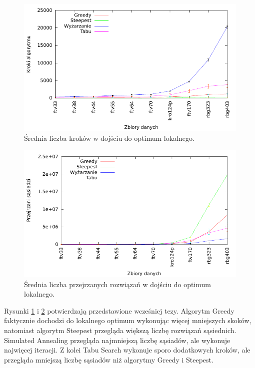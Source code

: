 \begin{figure}[!h]
\centering\includegraphics[width=12cm]{img/loc_skoki}
\caption{Średnia liczba kroków w dojściu do optimum lokalnego.}\label{rys:loc_skoki}
\end{figure}

\begin{figure}[!h]
\centering\includegraphics[width=12cm]{img/loc_sasiedzi}
\caption{Średnia liczba przejrzanych rozwiązań w dojściu do optimum lokalnego.}\label{rys:loc_sasiedzi}
\end{figure}

Rysunki \ref{rys:loc_skoki} i \ref{rys:loc_sasiedzi} potwierdzają przedstawione wcześniej tezy. Algorytm Greedy faktycznie dochodzi do lokalnego optimum wykonując więcej mniejszych skoków, natomiast algorytm Steepest przegląda większą liczbę rozwiązań sąsiednich. Simulated Annealing przegląda najmniejszą liczbę sąsiadów, ale wykonuje najwięcej iteracji. Z kolei Tabu Search wykonuje sporo dodatkowych kroków, ale przegląda mniejszą liczbę sąsiadów niż algorytmy Greedy i Steepest.